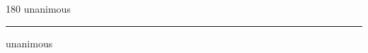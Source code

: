 
\begin{frame}
\begin{center}
\begin{turn}{180}
{\fontsize{2.5cm}{1em}\selectfont unanimous}
\end{turn}
\vspace{1em}\par  
\hrule
\vspace{1em}\par  
{\fontsize{2.5cm}{1em}\selectfont unanimous}
\end{center}
\end{frame}
